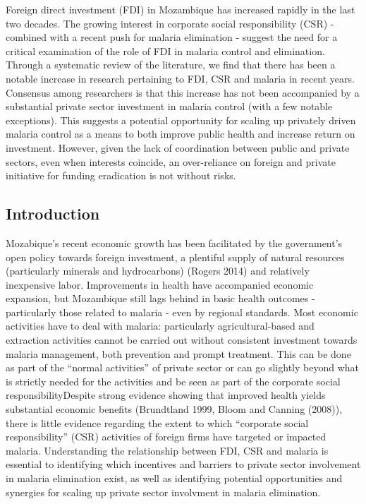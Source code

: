 \documentclass[]{elsarticle} %
\begin{document}
Foreign direct investment (FDI) in Mozambique has increased rapidly in
the last two decades. The growing interest in corporate social
responsibility (CSR) - combined with a recent push for malaria
elimination - suggest the need for a critical examination of the role of
FDI in malaria control and elimination. Through a systematic review of
the literature, we find that there has been a notable increase in
research pertaining to FDI, CSR and malaria in recent years. Consensus
among researchers is that this increase has not been accompanied by a
substantial private sector investment in malaria control (with a few
notable exceptions). This suggests a potential opportunity for scaling
up privately driven malaria control as a means to both improve public
health and increase return on investment. However, given the lack of
coordination between public and private sectors, even when interests
coincide, an over-reliance on foreign and private initiative for funding
eradication is not without risks.

\subsection{Introduction}\label{introduction}

Mozabique's recent economic growth has been facilitated by the
government's open policy towards foreign investment, a plentiful supply
of natural resources (particularly minerals and hydrocarbons) (Rogers
2014) and relatively inexpensive labor. Improvements in health have
accompanied economic expansion, but Mozambique still lags behind in
basic health outcomes - particularly those related to malaria - even by
regional standards. Most economic activities have to deal with malaria:
particularly agricultural-based and extraction activities cannot be
carried out without consistent investment towards malaria management,
both prevention and prompt treatment. This can be done as part of the
``normal activities'' of private sector or can go slightly beyond what
is strictly needed for the activities and be seen as part of the
corporate social responsibilityDespite strong evidence showing that
improved health yields substantial economic benefits (Brundtland 1999,
Bloom and Canning (2008)), there is little evidence regarding the extent
to which ``corporate social responsibility'' (CSR) activities of foreign
firms have targeted or impacted malaria. Understanding the relationship
between FDI, CSR and malaria is essential to identifying which
incentives and barriers to private sector involvement in malaria
elimination exist, as well as identifying potential opportunities and
synergies for scaling up private sector involvment in malaria
elimination.
\end{document}
